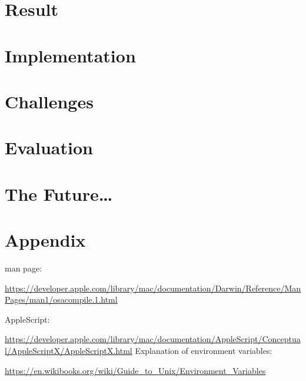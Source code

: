 \documentclass[12pt,a4paper,naustrian,english,oneside,openright,DIV=12,BCOR=1cm]{scrbook}
\begin{document}
\chapter{Result}
\def\kapitelautor{Christoph Führer}


\chapter{Implementation}


\chapter{Challenges}
\def\kapitelautor{Clemens Stadlbauer}


\chapter{Evaluation}
\def\kapitelautor{Julian Lorenz}


\chapter{The Future\ldots}


\clearpage
\def\kapitelautor{}
\appendix

\chapter{Appendix}

\printindex{}




\begin{thebibliography}{999}
	  man page:
	
		\url{https://developer.apple.com/library/mac/documentation/Darwin/Reference/ManPages/man1/osacompile.1.html}
	
	 AppleScript: 
	
		\url{https://developer.apple.com/library/mac/documentation/AppleScript/Conceptual/AppleScriptX/AppleScriptX.html}
	 Explanation of environment variables:  
	
		\url{https://en.wikibooks.org/wiki/Guide_to_Unix/Environment_Variables}
\end{thebibliography}
\end{document}
